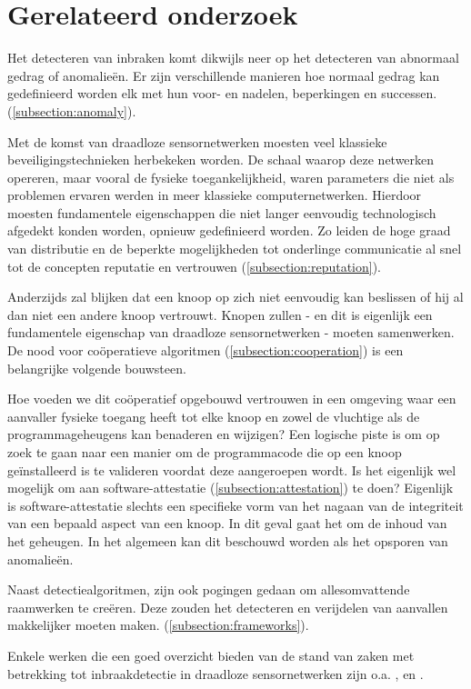 \section{Gerelateerd onderzoek}
\label{section:related}

Het detecteren van inbraken komt dikwijls neer op het detecteren van abnormaal
gedrag of anomalie\"en. Er zijn verschillende manieren hoe normaal gedrag kan
gedefinieerd worden elk met hun voor- en nadelen, beperkingen en successen.
(\ref{subsection:anomaly}).

Met de komst van draadloze sensornetwerken moesten veel klassieke
beveiligingstechnieken herbekeken worden. De schaal waarop deze netwerken
opereren, maar vooral de fysieke toegankelijkheid, waren parameters die niet
als problemen ervaren werden in meer klassieke computernetwerken. Hierdoor
moesten fundamentele eigenschappen die niet langer eenvoudig technologisch
afgedekt konden worden, opnieuw gedefinieerd worden. Zo leiden de hoge graad
van distributie en de beperkte mogelijkheden tot onderlinge communicatie al
snel tot de concepten reputatie en vertrouwen (\ref{subsection:reputation}).

Anderzijds zal blijken dat een knoop op zich niet eenvoudig kan beslissen of
hij al dan niet een andere knoop vertrouwt. Knopen zullen - en dit is eigenlijk
een fundamentele eigenschap van draadloze sensornetwerken - moeten samenwerken.
De nood voor co\"operatieve algoritmen (\ref{subsection:cooperation}) is een
belangrijke volgende bouwsteen.

Hoe voeden we dit co\"operatief opgebouwd vertrouwen in een omgeving waar een
aanvaller fysieke toegang heeft tot elke knoop en zowel de vluchtige als de
programmageheugens kan benaderen en wijzigen? Een logische piste is om op zoek
te gaan naar een manier om de programmacode die op een knoop ge\"installeerd is
te valideren voordat deze aangeroepen wordt. Is het eigenlijk wel mogelijk om
aan software-attestatie (\ref{subsection:attestation}) te doen? Eigenlijk is
software-attestatie slechts een specifieke vorm van het nagaan van de
integriteit van een bepaald aspect van een knoop. In dit geval gaat het om de
inhoud van het geheugen. In het algemeen kan dit beschouwd worden als het
opsporen van anomalie\"en.

Naast detectiealgoritmen, zijn ook pogingen gedaan om allesomvattende
raamwerken te cre\"eren. Deze zouden het detecteren en verijdelen van aanvallen
makkelijker moeten maken. (\ref{subsection:frameworks}).

Enkele werken die een goed overzicht bieden van de stand van zaken met
betrekking tot inbraakdetectie in draadloze sensornetwerken zijn o.a.
\citep{mishra2004intrusion}, \citep{ioannis2007towards}
\citep{padmavathi2009survey} en \citep{alrajeh2013intrusion}. 






